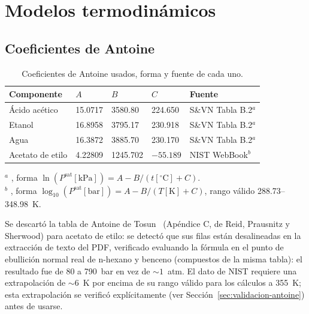 \documentclass[11pt,a4paper]{article}
\begin{document}
\section{Modelos termodinámicos}
\label{sec:modelos-termo}

\subsection{Coeficientes de Antoine}

\begin{table}[h]
\centering
\caption{Coeficientes de Antoine usados, forma y fuente de cada uno.}
\label{tab:antoine}
\begin{tabular}{@{}lllll@{}}
\toprule
Componente & $A$ & $B$ & $C$ & Fuente \\
\midrule
Ácido acético & 15.0717 & 3580.80 & 224.650 & S\&VN Tabla B.2$^{a}$ \\
Etanol        & 16.8958 & 3795.17 & 230.918 & S\&VN Tabla B.2$^{a}$ \\
Agua          & 16.3872 & 3885.70 & 230.170 & S\&VN Tabla B.2$^{a}$ \\
Acetato de etilo & 4.22809 & 1245.702 & $-55.189$ & NIST WebBook$^{b}$ \\
\bottomrule
\end{tabular}

\vspace{4pt}
\footnotesize
$^{a}$ \citet{smithvannessabbott}, forma $\ln(P^{\text{sat}}[\text{kPa}]) = A - B/(t[^{\circ}\text{C}]+C)$.\\
$^{b}$ \citet{nistwebbook}, forma $\log_{10}(P^{\text{sat}}[\text{bar}]) = A - B/(T[\text{K}]+C)$,
rango válido 288.73--348.98~K.
\end{table}

Se descartó la tabla de Antoine de Tosun~\citep{tosun2013} (Apéndice C,
de Reid, Prausnitz y Sherwood) para acetato de etilo: se detectó que
sus filas están desalineadas en la extracción de texto del PDF,
verificado evaluando la fórmula en el punto de ebullición normal real
de n-hexano y benceno (compuestos de la misma tabla): el resultado fue
de 80 a 790~bar en vez de $\sim 1$~atm. El dato de NIST requiere una
extrapolación de $\sim 6$~K por encima de su rango válido para los
cálculos a 355~K; esta extrapolación se verificó explícitamente (ver
Sección~\ref{sec:validacion-antoine}) antes de usarse.
\end{document}
